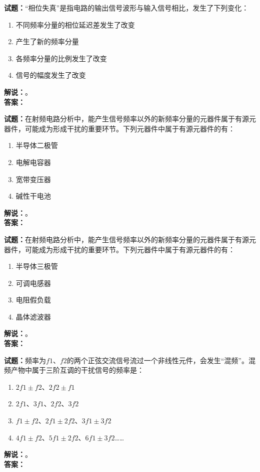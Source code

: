 \documentclass{ctexbook}
\begin{document}
\bigskip




\noindent\textbf{试题：}“相位失真”是指电路的输出信号波形与输入信号相比，发生了下列变化：
\begin{enumerate}[leftmargin=3em]
\item 不同频率分量的相位延迟差发生了改变
\item 产生了新的频率分量
\item 各频率分量的比例发生了改变
\item 信号的幅度发生了改变
\end{enumerate}
\noindent\textbf{解说：}\textbf{}。\\\noindent\textbf{答案：}

\bigskip




\noindent\textbf{试题：}在射频电路分析中，能产生信号频率以外的新频率分量的元器件属于有源元器件，可能成为形成干扰的重要环节。下列元器件中属于有源元器件的有：
\begin{enumerate}[leftmargin=3em]
\item 半导体二极管
\item 电解电容器
\item 宽带变压器
\item 碱性干电池
\end{enumerate}
\noindent\textbf{解说：}\textbf{}。\\\noindent\textbf{答案：}

\bigskip




\noindent\textbf{试题：}在射频电路分析中，能产生信号频率以外的新频率分量的元器件属于有源元器件，可能成为形成干扰的重要环节。下列元器件中属于有源元器件的有：
\begin{enumerate}[leftmargin=3em]
\item 半导体三极管
\item 可调电感器
\item 电阻假负载
\item 晶体滤波器
\end{enumerate}
\noindent\textbf{解说：}\textbf{}。\\\noindent\textbf{答案：}

\bigskip




\noindent\textbf{试题：}频率为\(f1\)、\(f2\)的两个正弦交流信号流过一个非线性元件，会发生“混频”。混频产物中属于三阶互调的干扰信号的频率是：
\begin{enumerate}[leftmargin=3em]
\item \(2f1\pm f2\)、\(2f2\pm f1\)
\item \(2f1\)、\(3f1\)、\(2f2\)、\(3f2\)
\item \(f1\pm f2\)、\(2f1\pm 2f2\)、\(3f1\pm 3f2\)
\item \(4f1\pm f2\)、\(5f1\pm 2f2\)、\(6f1\pm 3f2\)……
\end{enumerate}
\noindent\textbf{解说：}\textbf{}。\\\noindent\textbf{答案：}
\end{document}
